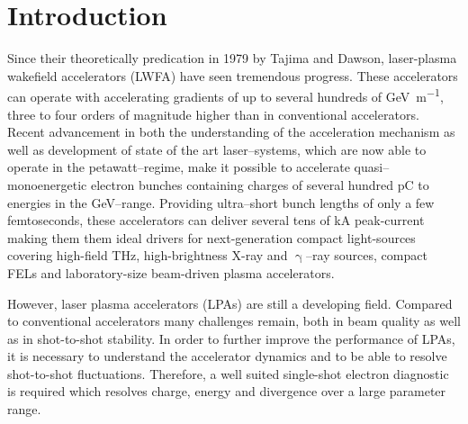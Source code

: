 \documentclass[%
reprint,
amsmath,
amssymb,
aip,
rsi, 
numerical,
floatfix,
]{revtex4-1}
\newcommand{\myCite}[1]{\textcolor{blue}{\cite{#1}}}
\begin{document}
\maketitle



\section{\label{Mot} Introduction}

Since their theoretically predication in 1979 by Tajima and Dawson\myCite{Tajima1979}, laser-plasma wakefield accelerators (LWFA) have seen tremendous progress. 
These accelerators can operate with accelerating gradients of up to several hundreds of \si{\giga\electronvolt\per\meter}, three to four orders of magnitude higher than in conventional accelerators.  
Recent advancement in both the understanding of the acceleration mechanism as well as development of state of the art laser--systems, which are now able to operate in the petawatt--regime\myCite{Schramm2017, Gaul2010}, make it possible to accelerate quasi--monoenergetic\myCite{Geddes2004, Faure2004, Mangles2004} electron bunches containing charges of several hundred \si{\pico\coulomb} to energies in the \si{\giga\electronvolt}--range\myCite{Leemans2014, Schroeder2007, Wang2013}.
Providing ultra--short bunch lengths of only a few femtoseconds, these accelerators can deliver several tens of kA peak-current \myCite{Couperus2017, Li2017} making them them ideal drivers for next-generation compact light-sources covering high-field THz\myCite{Leemans2003,Green2016}, high-brightness X-ray\myCite{Jochmann2013,Powers2014} and $\upgamma$--ray\myCite{TaPhuoc2012,Sarri2014} sources, compact FELs\myCite{Schlenvoigt2007,Fuchs2009,Maier2012,Huang2012,Steiniger2014} and laboratory-size beam-driven plasma accelerators\myCite{MartinezDelaOssa2013,MartinezDeLaOssa2015}.

However, laser plasma accelerators (LPAs) are still a developing field. 
Compared to conventional accelerators many challenges remain, both in beam quality as well as in shot-to-shot stability.
In order to further improve the performance of LPAs, it is necessary to understand the accelerator dynamics and to be able to resolve shot-to-shot fluctuations. 
Therefore, a well suited single-shot electron diagnostic is required which resolves charge, energy and divergence over a large parameter range. 
\end{document}
